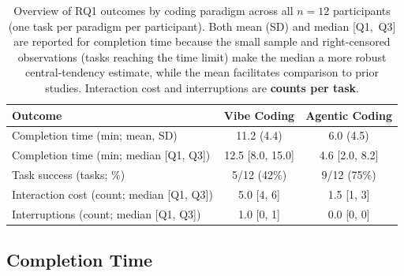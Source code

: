 \begin{table}[H]

  \centering

  \caption[Overview of RQ1 outcomes by paradigm]{Overview of RQ1 outcomes by coding paradigm across all $n=12$ participants (one task per paradigm per participant). Both mean (SD) and median [Q1,~Q3] are reported for completion time because the small sample and right-censored observations (tasks reaching the time limit) make the median a more robust central-tendency estimate, while the mean facilitates comparison to prior studies. Interaction cost and interruptions are \textbf{counts per task}.}

  \label{tab:rq1-overview}

  \renewcommand{\arraystretch}{1.15}


  \begin{tabular*}{\textwidth}{@{}>{\raggedright\arraybackslash}p{}cc}

    \toprule

    \rowcolor{accentblue}

    \textbf{Outcome} & \textbf{Vibe Coding} & \textbf{Agentic Coding} \\

    \midrule

    Completion time (min; mean, SD) & 11.2 (4.4) & 6.0 (4.5) \\

    Completion time (min; median [Q1, Q3]) & 12.5 [8.0, 15.0] & 4.6 [2.0, 8.2] \\

    Task success (tasks; \%) & 5/12 (42\%) & 9/12 (75\%) \\

    Interaction cost (count; median [Q1, Q3]) & 5.0 [4, 6] & 1.5 [1, 3] \\

    Interruptions (count; median [Q1, Q3]) & 1.0 [0, 1] & 0.0 [0, 0] \\

    \bottomrule

  \end{tabular*}

\end{table}

\subsection{Completion Time}
\label{sec:completion}

